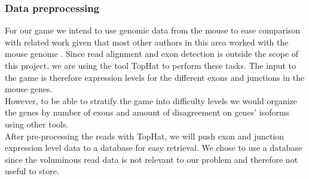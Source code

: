 \documentclass[12pt]{article}
\begin{document}
\subsubsection*{Data preprocessing}
For our game we intend to use genomic data from the mouse to ease comparison with related work given that most other authors in this area worked with the mouse genome \citep{trapnell2010transcript,guttman2010ab,feng2010inference,li2011isolasso}. Since read alignment and exon detection is outside the scope of this project, we are using the tool TopHat \citep{trapnell2009tophat} to perform these tasks. The input to the game is therefore expression levels for the different exons and junctions in the mouse genes. \\
However, to be able to stratify the game into difficulty levels we would organize the genes by number of exons and amount of disagreement on genes' isoforms using other tools. \\
After pre-processing the reads with TopHat, we will push exon and junction expression level data to a database for easy retrieval. We chose to use a database since the voluminous read data is not relevant to our problem and therefore not useful to store.
\end{document}
